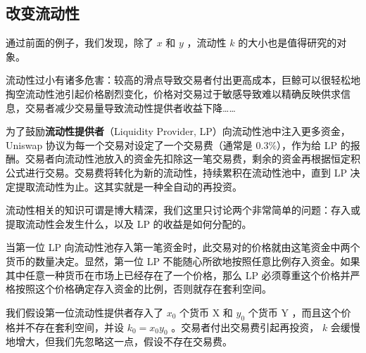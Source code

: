 \documentclass[12pt, a4paper, oneside]{ctexart}
\begin{document}
\subsection{改变流动性}

通过前面的例子，我们发现，除了 $x$ 和 $y$ ，流动性 $k$ 的大小也是值得研究的对象。

流动性过小有诸多危害：较高的滑点导致交易者付出更高成本，巨鲸可以很轻松地掏空流动性池引起价格剧烈变化，价格对交易过于敏感导致难以精确反映供求信息，交易者减少交易量导致流动性提供者收益下降……

为了鼓励\textbf{流动性提供者}（Liquidity Provider, LP）向流动性池中注入更多资金， Uniswap 协议为每一个交易对设定了一个交易费（通常是 $0.3\%$），作为给 LP 的报酬。交易者向流动性池放入的资金先扣除这一笔交易费，剩余的资金再根据恒定积公式进行交易。交易费将转化为新的流动性，持续累积在流动性池中，直到 LP 决定提取流动性为止。这其实就是一种全自动的再投资。

流动性相关的知识可谓是博大精深，我们这里只讨论两个非常简单的问题：存入或提取流动性会发生什么，以及 LP 的收益是如何分配的。

当第一位 LP 向流动性池存入第一笔资金时，此交易对的价格就由这笔资金中两个货币的数量决定。显然，第一位 LP 不能随心所欲地按照任意比例存入资金。如果其中任意一种货币在市场上已经存在了一个价格，那么 LP 必须尊重这个价格并严格按照这个价格确定存入资金的比例，否则就存在套利空间。

我们假设第一位流动性提供者存入了 $x_0$ 个货币 X 和 $y_0$ 个货币 Y ，而且这个价格并不存在套利空间，并设 $k_0 = x_0y_0$ 。交易者付出交易费引起再投资， $k$ 会缓慢地增大，但我们先忽略这一点，假设不存在交易费。
\end{document}
